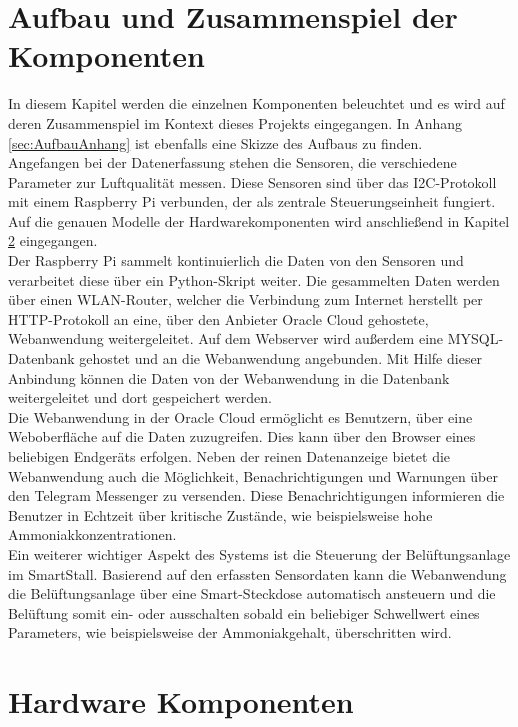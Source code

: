 \documentclass[conference]{IEEEtran}
\begin{document}
\section{Aufbau und Zusammenspiel der Komponenten}
In diesem Kapitel werden die einzelnen Komponenten beleuchtet und es wird auf deren Zusammenspiel im Kontext dieses Projekts eingegangen. In Anhang \ref{sec:AufbauAnhang} ist ebenfalls eine Skizze des Aufbaus zu finden. \\
Angefangen bei der Datenerfassung stehen die Sensoren, die verschiedene Parameter zur Luftqualität messen. Diese Sensoren sind über das I2C-Protokoll mit einem Raspberry Pi verbunden, der als zentrale Steuerungseinheit fungiert. Auf die genauen Modelle der Hardwarekomponenten wird anschließend in Kapitel \ref{chapter:hw_komponenten} eingegangen. \\
Der Raspberry Pi sammelt kontinuierlich die Daten von den Sensoren und verarbeitet diese über ein Python-Skript weiter. Die gesammelten Daten werden über einen WLAN-Router, welcher die Verbindung zum Internet herstellt per HTTP-Protokoll an eine, über den Anbieter Oracle Cloud gehostete, Webanwendung weitergeleitet. Auf dem Webserver wird außerdem eine MYSQL-Datenbank gehostet und an die Webanwendung angebunden. Mit Hilfe dieser Anbindung können die Daten von der Webanwendung in die Datenbank weitergeleitet und dort gespeichert werden. \\
Die Webanwendung in der Oracle Cloud ermöglicht es Benutzern, über eine Weboberfläche auf die Daten zuzugreifen. Dies kann über den Browser eines beliebigen Endgeräts erfolgen. Neben der reinen Datenanzeige bietet die Webanwendung auch die Möglichkeit, Benachrichtigungen und Warnungen über den Telegram Messenger zu versenden. Diese Benachrichtigungen informieren die Benutzer in Echtzeit über kritische Zustände, wie beispielsweise hohe Ammoniakkonzentrationen. \\
Ein weiterer wichtiger Aspekt des Systems ist die Steuerung der Belüftungsanlage im SmartStall. Basierend auf den erfassten Sensordaten kann die Webanwendung die Belüftungsanlage über eine Smart-Steckdose automatisch ansteuern und die Belüftung somit ein- oder ausschalten sobald ein beliebiger Schwellwert eines Parameters, wie beispielsweise der Ammoniakgehalt, überschritten wird. 


\section{Hardware Komponenten}
\label{chapter:hw_komponenten}
\end{document}
